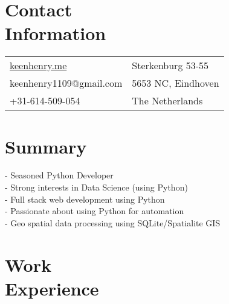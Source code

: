 \documentclass[margin,line]{resume}
\begin{document}
\begin{resume}

    \section{\myheadingstyle Contact \\ Information}
      \begin{tabular}{@{}p{7cm}p{6cm}}
      \url{keenhenry.me}      & Sterkenburg 53-55 \\
      keenhenry1109@gmail.com & 5653 NC, Eindhoven \\
      +31-614-509-054        & The Netherlands \\
      \end{tabular}
 
    \section{\myheadingstyle Summary}
      - Seasoned Python Developer \\
      - Strong interests in Data Science (using Python) \\
      - Full stack web development using Python \\
      - Passionate about using Python for automation \\
      - Geo spatial data processing using SQLite/Spatialite GIS \\
    \vspace{-5mm}

    \section{\myheadingstyle Work \\ Experience}


\end{resume}
\end{document}
